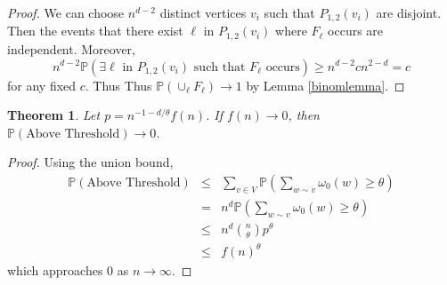 \documentclass{amsart}
\newcommand{\prob}{\mathbb{P}}
\newcommand{\threshold}{\theta}
\newcommand{\noodle}{r}
\newcommand{\abovethresh}{\text{Above Threshold}}
\newcommand{\I}[2]{\hbox{Initial}\left(#1, \geq #2\right)}
\newcommand{\Gone}[1]{\hbox{Cross Lines}_m(#1)}
\newcommand{\Gtwo}[1]{\hbox{Cross Lines}_r(#1)}
\numberwithin{equation}{section}
\newcommand{\Ln}{\ell}
\newtheorem{theorem}{Theorem}[section]
\theoremstyle{definition}
\theoremstyle{remark}
\begin{document}
\begin{proof}
We can choose $n^{d-2}$ distinct vertices $v_i$ such that $P_{1,2}(v_i)$ are disjoint. Then the
events that there exist $\Ln$ in $P_{1,2}(v_i)$ where $F_\Ln$ occurs are independent.
Moreover, 
$$n^{d-2}\prob(\exists \Ln \text{ in $P_{1,2}(v_i)$ such that $F_\Ln$ occurs})
\geq n^{d-2}cn^{2-d}=c$$
for any fixed $c$. Thus
Thus $\prob(\cup_\Ln F_\Ln)\to 1$ by Lemma \ref{binomlemma}. 
\end{proof}

\begin{theorem}\label{molar}
Let $p = n^{-1-d/\threshold}f(n)$. If $f(n) \to 0$, then $\prob(\abovethresh) \to 0$. 
\end{theorem}

\begin{proof} 
Using the union bound, 
\begin{eqnarray*}
\prob(\abovethresh) 
&\leq& \sum_{v \in V}\prob\left(\sum_{w \sim v}\omega_0(w)\geq \threshold \right)\\
&=& n^d\prob\left(\sum_{w \sim v}\omega_0(w)\geq \threshold \right)\\
&\le& n^d{n \choose \threshold}p^\threshold\\
&\le& f(n)^\threshold 
\end{eqnarray*}
which approaches 0 as $n \to \infty$.
%
\end{proof}
\end{document}

